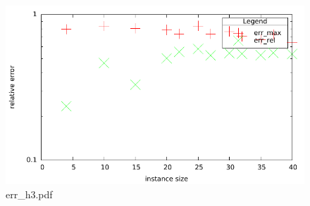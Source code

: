 \documentclass[12pt,a4paper]{article}
\begin{document}
\begin{figure}[H]
\caption{err\_h3.pdf }
\includegraphics{./err_h3.pdf}
\end{figure}


\end{document}

